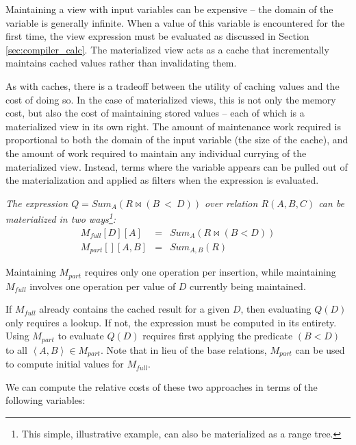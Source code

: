 Maintaining a view with input variables can be expensive -- the domain of the variable is generally infinite.  When a value of this variable is encountered for the first time, the view expression must be evaluated as discussed in Section \ref{sec:compiler_calc}.  The materialized view acts as a cache that incrementally maintains cached values rather than invalidating them.

As with caches, there is a tradeoff between the utility of caching values and the cost of doing so.  In the case of materialized views, this is not only the memory cost, but also the cost of maintaining stored values -- each of which is a materialized view in its own right.  The amount of maintenance work required is proportional to both the domain of the input variable (the size of the cache), and the amount of work required to maintain any individual currying of the materialized view.  Instead, terms where the variable appears can be pulled out of the materialization and applied as filters when the expression is evaluated.

\begin{example} \em
The expression $Q = Sum_A(R \bowtie (B~<~D))$ over relation $R(A,B,C)$ can be materialized in two ways\footnote{This simple, illustrative example, can also be materialized as a range tree.}:
{\small \begin{eqnarray*}
M_{full}[D][A] & = & Sum_A(R \bowtie (B < D)) \\
M_{part}[][A,B] & = & Sum_{A,B}(R)
\end{eqnarray*}}
\end{example}

Maintaining $M_{part}$ requires only one operation per insertion, while maintaining $M_{full}$ involves one operation per value of $D$ currently being maintained.  

  If $M_{full}$ already contains the cached result for a given $D$, then evaluating $Q(D)$ only requires a lookup.  If not, the expression must be computed in its entirety.  Using $M_{part}$ to evaluate $Q(D)$ requires first applying the predicate $(B < D)$ to all $\left<A,B\right> \in M_{part}$.  Note that in lieu of the base relations, $M_{part}$ can be used to compute initial values for $M_{full}$.

We can compute the relative costs of these two approaches in terms of the following variables:

